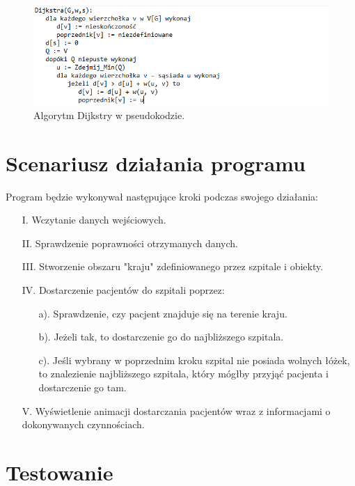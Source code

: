 \documentclass{article}
\begin{document}
\begin{itemize}
            \begin{figure}[ht]
                \centering
                \includegraphics[scale=0.7]{Dijkstra.png}
                \caption{Algorytm Dijkstry w pseudokodzie.}
            \end{figure}
        
    \end{itemize}

\section{Scenariusz działania programu}

    Program będzie wykonywał następujące kroki podczas swojego działania:
    \begin{itemize}
        \item[I.] Wczytanie danych wejściowych.
        \item[II.] Sprawdzenie poprawności otrzymanych danych.
        \item[III.] Stworzenie obszaru "kraju"  zdefiniowanego przez szpitale i obiekty.
        \item[IV.] Dostarczenie pacjentów do szpitali poprzez:
        \begin{itemize}
            \item[a).] Sprawdzenie, czy pacjent znajduje się na terenie kraju.
            \item[b).] Jeżeli tak, to dostarczenie go do najbliższego szpitala.
            \item[c).] Jeśli wybrany w poprzednim kroku szpital nie posiada wolnych łóżek, to znalezienie najbliższego szpitala, który mógłby przyjąć pacjenta i dostarczenie go tam. 
        \end{itemize}
        \item[V.] Wyświetlenie animacji dostarczania pacjentów wraz z informacjami o dokonywanych czynnościach.
    \end{itemize}
    
\section{Testowanie}
\end{document}
